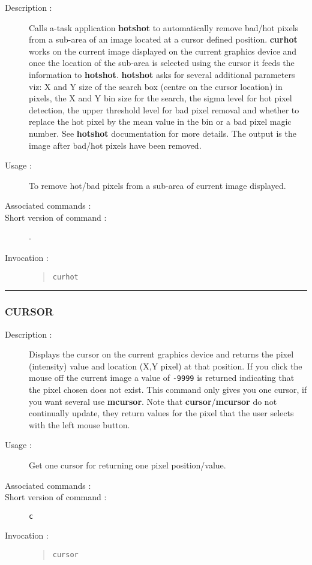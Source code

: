 \begin{description}

\item[Description :] Calls a-task application {\bf hotshot} to automatically
remove bad/hot pixels from a sub-area of an image located at a cursor
defined position.  {\bf curhot} works on the current image displayed on the
current graphics device and once the location of the sub-area is
selected using the cursor it feeds the information to {\bf hotshot}.
{\bf hotshot} asks for several additional parameters viz: X and Y size
of the search box (centre on the cursor location) in pixels, the X and
Y bin size for the search, the sigma level for hot pixel detection, the
upper threshold level for bad pixel removal and whether to replace the
hot pixel by the mean value in the bin or a bad pixel magic number.
See {\bf hotshot} documentation for more details. The output is the
image after bad/hot pixels have been removed.

\item[Usage :] To remove hot/bad pixels from a sub-area of current image 
displayed.
\item[Associated commands :] {\tt {}}
\item[Short version of command :] -
\item[Invocation :]

\begin{quote}{\tt  curhot }\end{quote}

\end{description}

\hrule 
\subsubsection*{\label{CURSOR}CURSOR}

\begin{description}

\item[Description :] Displays the cursor on the current graphics device
and returns the pixel (intensity) value and location (X,Y pixel) at
that position. If you click the mouse off the current image a value of
{\tt -9999} is returned indicating that the pixel chosen does not
exist. This command only gives you one cursor, if you want several use
{\bf mcursor}. Note that {\bf cursor}/{\bf mcursor} do not continually
update, they return values for the pixel that the user selects with the
left mouse button.

\item[Usage :] Get one cursor for returning one pixel position/value.
\item[Associated commands :] {\tt {}}
\item[Short version of command :] {\tt c}
\item[Invocation :]

\begin{quote}{\tt  cursor }\end{quote}

\end{description}

